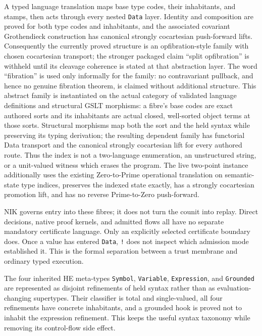 \documentclass[11pt]{article}
\newcommand{\code}[1]{\texttt{#1}}
\begin{document}
A typed language translation maps base type codes, their inhabitants, and stamps,
then acts through every nested \code{Data} layer.  Identity and composition are
proved for both type codes and inhabitants, and the associated covariant
Grothendieck construction has canonical strongly cocartesian push-forward lifts.
Consequently the currently proved structure is an opfibration-style family with
chosen cocartesian transport; the stronger packaged claim ``split opfibration''
is withheld until its cleavage coherence is stated at that abstraction layer.
The word ``fibration'' is used only informally for the family: no contravariant
pullback, and hence no genuine fibration theorem, is claimed without additional
structure.  This abstract family is instantiated on the actual category of
validated language definitions and structural GSLT morphisms: a fibre's base
codes are exact authored sorts and its inhabitants are actual closed,
well-sorted object terms at those sorts.  Structural morphisms map both the
sort and the held syntax while preserving its typing derivation; the resulting
dependent family has functorial Data transport and the canonical
strongly cocartesian lift for every authored route.  Thus the index is not a
two-language enumeration, an unstructured string, or a unit-valued witness
which erases the program.  The live two-point instance
additionally uses the existing Zero-to-Prime
operational translation on semantic-state type indices, preserves the indexed
state exactly, has a strongly cocartesian promotion lift, and has no reverse
Prime-to-Zero push-forward.

NIK governs entry into these fibres; it does not turn the counit into replay.
Direct decisions, native proof kernels, and admitted flows all have no separate
mandatory certificate language.  Only an explicitly selected certificate
boundary does.  Once a value has entered \code{Data}, \code{!} does not inspect
which admission mode established it.  This is the formal separation between a
trust membrane and ordinary typed execution.

The four inherited HE meta-types \code{Symbol}, \code{Variable},
\code{Expression}, and \code{Grounded} are represented as disjoint refinements of
held syntax rather than as evaluation-changing supertypes.  Their classifier is
total and single-valued, all four refinements have concrete inhabitants, and a
grounded hook is proved not to inhabit the expression refinement.  This keeps the
useful syntax taxonomy while removing its control-flow side effect.
\end{document}
